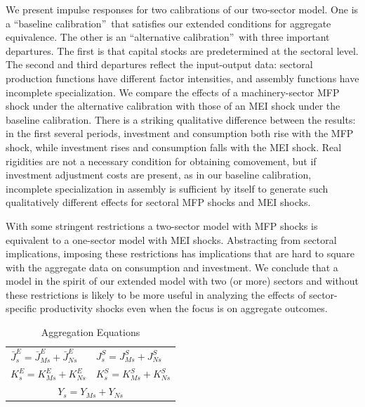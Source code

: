 \documentclass[12pt,fleqn]{article}
\renewcommand{\baselinestretch}{1.5}
\begin{document}
{\normalsize We present impulse responses for two calibrations of
our two-sector model. One is a \textquotedblleft baseline
calibration\textquotedblright\ that satisfies our extended
conditions for aggregate equivalence. The other is an
\textquotedblleft alternative calibration\textquotedblright\ with
three important departures. The first is that capital stocks are
predetermined at the sectoral level. The second and third departures
reflect the input-output data: sectoral production functions have
different factor intensities, and assembly functions have incomplete
specialization. We compare the effects of a machinery-sector MFP
shock under the alternative calibration with those of an MEI shock
under the baseline calibration. There is a striking qualitative
difference between the results: in the first several periods,
investment and consumption both rise with the MFP shock, while
investment rises and consumption falls with the MEI shock. Real
rigidities are not a necessary condition for obtaining comovement,
but if investment adjustment costs are present, as in our
baseline calibration, incomplete specialization in assembly is
sufficient by itself to generate such qualitatively different
effects for sectoral MFP shocks and MEI shocks.}

{\normalsize With some stringent restrictions a two-sector model with MFP
shocks is equivalent to a one-sector model with MEI shocks. Abstracting from
sectoral implications, imposing these restrictions has implications that are
hard to square with the aggregate data on consumption and investment. We conclude that a model in the spirit of our extended model
with two (or more) sectors and without these restrictions is likely to be
more useful in analyzing the effects of sector-specific productivity shocks
even when the focus is on aggregate outcomes. }

\clearpage


\renewcommand{\baselinestretch}{1}
 \normalsize


\clearpage

\renewcommand{\baselinestretch}{1.5} \normalsize

\begin{table}
\center \caption{Aggregation Equations} \label{aggregation_table}
\vspace{0.5cm}
\begin{tabular}{|l|l|}
\hline
$\bar{J}^E_s = \bar{J}^E_{Ms} + \bar{J}^E_{Ns}$ & $J^S_s = J^S_{Ms} + J^S_{Ns}$ \\
$K^E_s = K^E_{Ms} + K^E_{Ns}$ & $K^S_s = K^S_{Ms} + K^S_{Ns}$ \\
\hline
\multicolumn{2}{|c|}{$Y_s = Y_{Ms}+Y_{Ns} $}  \\
\hline
\end{tabular}
\end{table}
\end{document}
